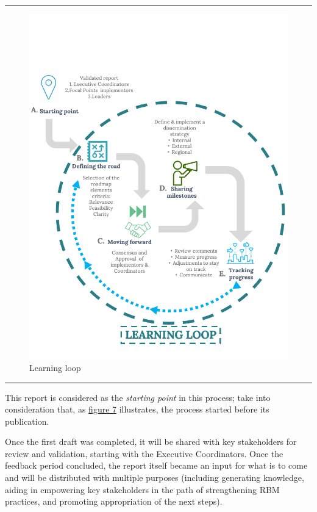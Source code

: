 \documentclass[
  10pt,
]{book}
\begin{document}
\begin{center}\rule{0.5\linewidth}{0.5pt}\end{center}

\begin{figure}

{\centering \includegraphics[width=0.75\linewidth]{./images/figure_7} 

}

\caption{Learning loop}\label{fig:figure7}
\end{figure}

\begin{center}\rule{0.5\linewidth}{0.5pt}\end{center}

This report is considered as the \emph{starting point} in this process; take into consideration that, as \protect\hyperlink{fig:figure7}{figure 7} illustrates, the process started before its publication.

Once the first draft was completed, it will be shared with key stakeholders for review and validation, starting with the Executive Coordinators. Once the feedback period concluded, the report itself became an input for what is to come and will be distributed with multiple purposes (including generating knowledge, aiding in empowering key stakeholders in the path of strengthening RBM practices, and promoting appropriation of the next steps).
\end{document}
